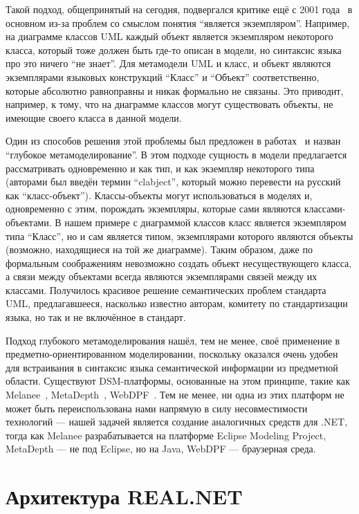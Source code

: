 \documentclass{spisok-article}
\begin{document}
Такой подход, общепринятый на сегодня, подвергался критике ещё с 2001 года~\cite{atkinson2001multilevel} в основном из-за проблем со смыслом понятия ``является экземпляром''. Например, на диаграмме классов UML каждый объект является экземпляром некоторого класса, который тоже должен быть где-то описан в модели, но синтаксис языка про это ничего ``не знает''. Для метамодели UML и класс, и объект являются экземплярами языковых конструкций ``Класс'' и ``Объект'' соответственно, которые абсолютно равноправны и никак формально не связаны. Это приводит, например, к тому, что на диаграмме классов могут существовать объекты, не имеющие своего класса в данной модели.

Один из способов решения этой проблемы был предложен в работах~\cite{atkinson2001multilevel, atkinson2003model, atkinson2015defence} и назван ``глубокое метамоделирование''. В этом подходе сущность в модели предлагается рассматривать одновременно и как тип, и как экземпляр некоторого типа (авторами был введён термин ``clabject'', который можно перевести на русский как ``класс-объект''). Классы-объекты могут использоваться в моделях и, одновременно с этим, порождать экземпляры, которые сами являются классами-объектами. В нашем примере с диаграммой классов класс является экземпляром типа ``Класс'', но и сам является типом, экземплярами которого являются объекты (возможно, находящиеся на той же диаграмме). Таким образом, даже по формальным соображениям невозможно создать объект несуществующего класса, а связи между объектами всегда являются экземплярами связей между их классами. Получилось красивое решение семантических проблем стандарта UML, предлагавшееся, насколько известно авторам, комитету по стандартизации языка, но так и не включённое в стандарт.

Подход глубокого метамоделирования нашёл, тем не менее, своё применение в предметно-ориентированном моделировании, поскольку оказался очень удобен для встраивания в синтаксис языка семантической информации из предметной области. Существуют DSM-платформы, основанные на этом принципе, такие как Melanee~\cite{atkinson2016melanee}, MetaDepth~\cite{delara2010deep, delara2012domain}, WebDPF~\cite{rabbi2016webdpf}. Тем не менее, ни одна из этих платформ не может быть переиспользована нами напрямую в силу несовместимости технологий --- нашей задачей является создание аналогичных средств для .NET, тогда как Melanee разрабатывается на платформе Eclipse Modeling Project, MetaDepth --- не под Eclipse, но на Java, WebDPF --- браузерная среда.

\section{Архитектура REAL.NET}
\end{document}
